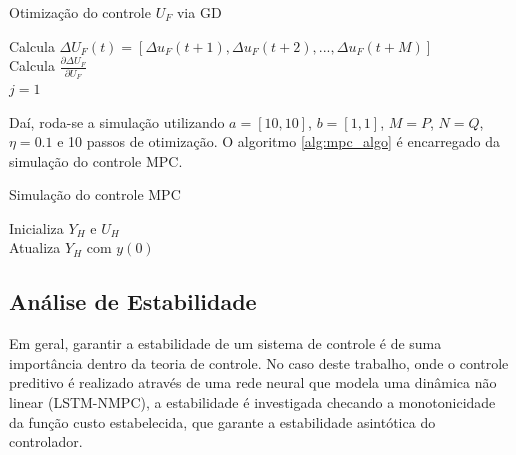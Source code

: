 \newpage
\begin{algorithm}{
    \label{alg:compute_step}
    \caption{Otimização do controle $U_F$ via GD}
    Calcula $\Delta U_F(t) = [\Delta u_F(t+1), \Delta u_F(t+2), ... , \Delta u_F(t+M)]$\; \\
    Calcula $\frac{\partial \Delta U_F}{\partial U_F}$\;\\
    $j = 1$\; \\
}
\end{algorithm}

Daí, roda-se a simulação utilizando $a=[10,10]$, $b=[1, 1]$, $M=P$, $N=Q$, $\eta=0.1$ e 10 passos de otimização. O algoritmo \ref{alg:mpc_algo} é encarregado da simulação do controle MPC.
\begin{algorithm}{
    \label{alg:mpc_algo}
    \caption{Simulação do controle MPC}
    Inicializa $Y_H$ e $U_H$\; \\
    Atualiza $Y_H$ com $y(0)$\; \\
}
\end{algorithm}

\newpage
\subsection{Análise de Estabilidade}
Em geral, garantir a estabilidade de um sistema de controle é de suma importância dentro da teoria de controle. No caso deste trabalho, onde o controle preditivo é realizado através de uma rede neural que modela uma dinâmica não linear (LSTM-NMPC), a estabilidade é investigada checando a monotonicidade da função custo estabelecida, que garante a estabilidade asintótica do controlador.

